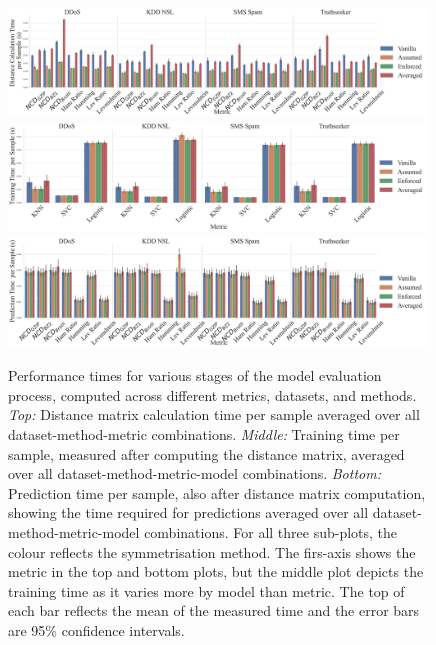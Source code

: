 \documentclass[preprint,12pt]{article}
\begin{document}
\begin{figure}[htb!]
    \centering
    \includegraphics[width=0.99\textwidth]{images/distance_time_vs_symmetry.pdf}
    \hfill
    \includegraphics[width=0.99\textwidth]{images/train_time_vs_symmetry.pdf}
    \hfill
    \includegraphics[width=0.99\textwidth]{images/pred_time_vs_symmetry.pdf}
    \caption{
        Performance times for various stages of the model evaluation process, computed across different metrics, datasets, and methods. \textit{Top:} Distance matrix calculation time per sample averaged over all dataset-method-metric combinations. \textit{Middle:} Training time per sample, measured after computing the distance matrix, averaged over all dataset-method-metric-model combinations. \textit{Bottom:} Prediction time per sample, also after distance matrix computation, showing the time required for predictions averaged over all dataset-method-metric-model combinations. For all three sub-plots, the colour reflects the symmetrisation method. The firs-axis shows the metric in the top and bottom plots, but the middle plot depicts the training time as it varies more by model than metric.
        The top of each bar reflects the mean of the measured time and the error bars are 95\% confidence intervals.
    }
    \label{fig:times}
\end{figure}
\end{document}
